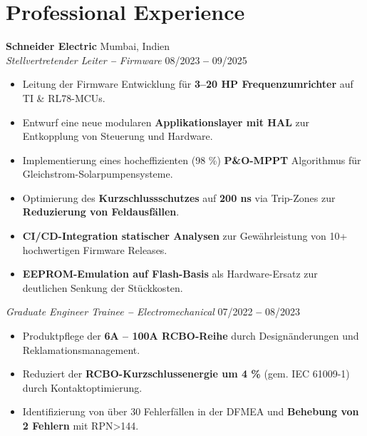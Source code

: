 \documentclass[letterpaper,11pt]{article}
\begin{document}
\section{Professional Experience}
\textbf{Schneider Electric} \hfill Mumbai, Indien \\
\textit{Stellvertretender Leiter \textbf{--} Firmware} \hfill 08/2023  \textbf{--}  09/2025 \\
\begin{itemize}[leftmargin=*]
    \item Leitung der Firmware Entwicklung für \textbf{3–20 HP Frequenzumrichter} auf TI \& RL78-MCUs.
    \item Entwurf eine neue modularen \textbf{Applikationslayer mit HAL} zur Entkopplung von Steuerung und Hardware.
    \item Implementierung eines hocheffizienten (98 \%) \textbf{P\&O-MPPT} Algorithmus für Gleichstrom-Solarpumpensysteme.   
    \item Optimierung des \textbf{Kurzschlussschutzes} auf \textbf{200 ns} via Trip-Zones zur \textbf{Reduzierung von Feldausfällen}.
    \item \textbf{CI/CD-Integration statischer Analysen} zur Gewährleistung von 10+ hochwertigen Firmware Releases.
    \item \textbf{EEPROM-Emulation auf Flash-Basis} als Hardware-Ersatz zur deutlichen Senkung der Stückkosten.    
  \end{itemize}
\vspace{8pt}
\noindent
\textit{Graduate Engineer Trainee \textbf{--} Electromechanical} \hfill 07/2022 \textbf{--} 08/2023 \\
\begin{itemize}[leftmargin=*]
    \item Produktpflege der \textbf{6A -- 100A RCBO-Reihe} durch Designänderungen und Reklamationsmanagement.  
    \item Reduziert der \textbf{RCBO-Kurzschlussenergie um 4 \%} (gem. IEC 61009-1) durch Kontaktoptimierung.
    \item Identifizierung von über 30 Fehlerfällen in der DFMEA und \textbf{Behebung von 2 Fehlern} mit RPN>144.
  \end{itemize}
\end{document}
